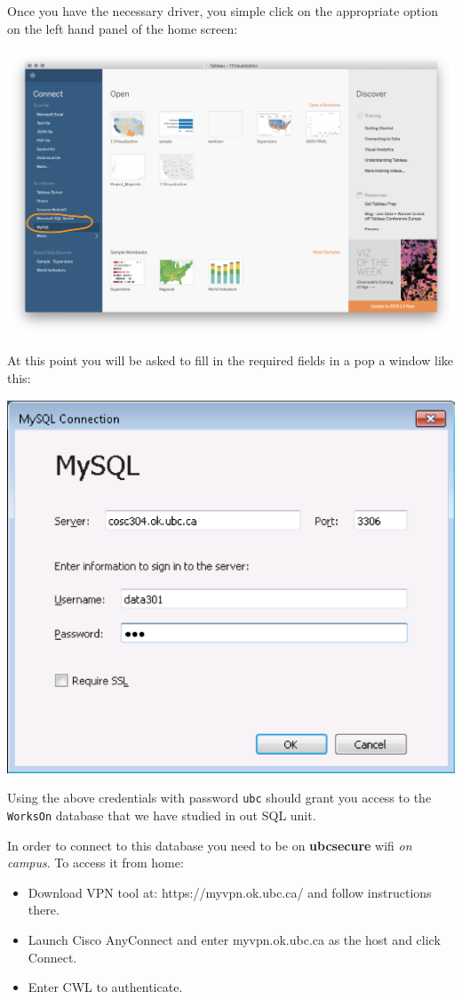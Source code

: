 \documentclass[xcolor=svgnames]{beamer} %
\begin{document}
\begin{frame}
Once you have the necessary driver, you simple click on the appropriate option on the left hand panel of the home screen:
\begin{center}
\includegraphics[width=.85\textwidth]{img/sql}
\end{center}
\end{frame}


\begin{frame}
At this point you will be asked to fill in the required fields in a pop a window like this:
\begin{center}
\includegraphics[width=.5\textwidth]{img/mysql}
\end{center}
Using the above credentials with password {\tt ubc} should grant you access to the {\tt WorksOn} database that we have studied in out SQL unit.
\end{frame}

\begin{frame}
In order to connect to this database you need to be on {\bf ubcsecure} wifi \textit{on campus}. 
\vfill
To access it from home:
\begin{itemize}
\item Download VPN tool at: https://myvpn.ok.ubc.ca/ and follow instructions there.
\item Launch Cisco AnyConnect and enter myvpn.ok.ubc.ca as the host and click Connect.
\item Enter CWL to authenticate.
\end{itemize}

\end{frame}
\end{document}

